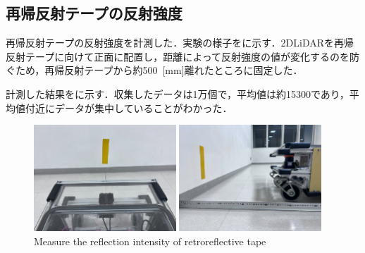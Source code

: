\newpage

\subsection{再帰反射テープの反射強度}

  再帰反射テープの反射強度を計測した．実験の様子をに示す．2DLiDARを再帰反射テープに向けて正面に配置し，距離によって反射強度の値が変化するのを防ぐため，再帰反射テープから約500 \,[mm]離れたところに固定した．
    
  計測した結果をに示す．収集したデータは1万個で，平均値は約15300であり，平均値付近にデータが集中していることがわかった．

  \begin{figure}[h]
    \centering
    \begin{minipage}[c]{65mm} 
        \centering
        \includegraphics[height=40mm]{images/RobotGuidance_exp2_tape_from_back.png}
    \end{minipage}
    \begin{minipage}[c]{65mm} 
        \centering
        \includegraphics[height=40mm]{images/RobotGuidance_exp2_tape_from_side.png}
    \end{minipage}
    \caption{Measure the reflection intensity of retroreflective tape}
    \label{Fig:RobotGuidance_exp2_tape}
  \end{figure}

